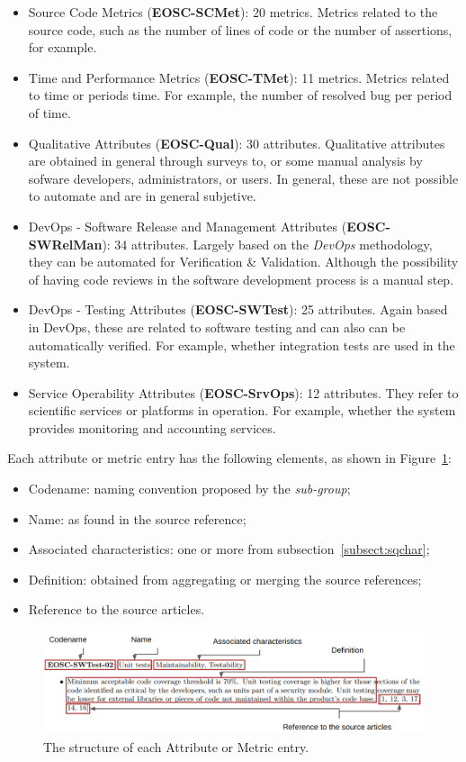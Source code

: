 \documentclass[a4paper]{article}
\begin{document}
\begin{itemize}
    \item Source Code Metrics (\textbf{EOSC-SCMet}): 20 metrics. Metrics related to the source code, such as the number of lines of code or the number of assertions, for example.

    \item Time and Performance Metrics (\textbf{EOSC-TMet}): 11 metrics. Metrics related to time or periods time. For example, the number of resolved bug per period of time.

    \item Qualitative Attributes (\textbf{EOSC-Qual}): 30 attributes. Qualitative attributes are obtained in general through surveys to, or some manual analysis by sofware developers, administrators, or users. In general, these are not possible to automate and are in general subjetive.

    \item DevOps - Software Release and Management Attributes (\textbf{EOSC-SWRelMan}): 34 attributes. Largely based on the \textit{DevOps} methodology, they can be automated for Verification \& Validation. Although the possibility of having code reviews in the software development process is a manual step.

    \item DevOps - Testing Attributes (\textbf{EOSC-SWTest}): 25 attributes. Again based in DevOps, these are related to software testing and can also can be automatically verified. For example, whether integration tests are used in the system.

    \item Service Operability Attributes (\textbf{EOSC-SrvOps}): 12 attributes. They refer to scientific services or platforms in operation. For example, whether the system provides monitoring and accounting services.
\end{itemize}

Each attribute or metric entry has the following elements, as shown in Figure~\ref{fig:sqattr}:

\begin{itemize}
    \item Codename: naming convention proposed by the \textit{sub-group};
    \item Name: as found in the source reference;
    \item Associated characteristics: one or more from subsection~\ref{subsect:sqchar};
    \item Definition: obtained from aggregating or merging the source references;
    \item Reference to the source articles.
\end{itemize}

\begin{figure}[h]
    \centering
    \includegraphics[width=0.9\linewidth]{../imgs/qa.png}
    \caption{The structure of each Attribute or Metric entry.}
    \label{fig:sqattr}
\end{figure}

\newpage


\newpage
\printbibliography
\end{document}
